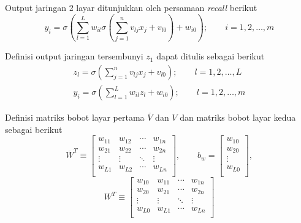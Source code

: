 \noindent Output jaringan 2 layar ditunjukkan oleh persamaan \textit{recall} berikut
\begin{equation} \label{eq:3:2layerOut}
y_i = \sigma
\left(
\sum_{l=1}^{L}w_{il}\sigma
	\left(
		\sum_{j=1}^{n}v_{lj}x_j + v_{l0}
	\right)
	+ w_{i0}
\right); \qquad i = 1,2,\dots,m
\end{equation}
\vspace{1em}

\noindent Definisi output jaringan tersembunyi $z_1$ dapat ditulis sebagai berikut
\begin{equation} \label{eq:3:hiddenlayer}
\begin{split}
z_l = \sigma\left(\sum_{j=1}^{n}v_{lj}x_j+v_{l0} \right);\qquad l = 1,2,\dots,L\\
y_i = \sigma\left(\sum_{l=1}^{L}w_{il}z_l+w_{i0} \right);\qquad l = 1,2,\dots,m
\end{split}
\end{equation}
\vspace{1em}

\noindent Definisi matriks bobot layar pertama $\overline{V}$ dan $V$ dan matriks bobot layar kedua sebagai berikut
\begin{equation} \label{eq:3:weight21Vector}
\overline{W}^T \equiv
\left[
\begin{matrix}
w_{11} & w_{12} & \cdots & w_{1n} \\
w_{21} & w_{22} & \cdots & w_{2n} \\
\vdots & \vdots & \ddots & \vdots \\
w_{L1} & w_{L2} & \cdots & w_{Ln} \\
\end{matrix}
\right], \qquad
b_w = 
\left[
\begin{matrix}
w_{10} \\
w_{20} \\
\vdots \\
w_{L0} \\
\end{matrix}
\right],
\end{equation}
\begin{equation} \label{eq:3:weight22Vector}
W^T \equiv
\left[
\begin{matrix}
w_{10} & w_{11} & \cdots & w_{1n} \\
w_{20} & w_{21} & \cdots & w_{2n} \\
\vdots & \vdots & \ddots & \vdots \\
w_{L0} & w_{L1} & \cdots & w_{Ln} \\
\end{matrix}
\right]
\end{equation}

